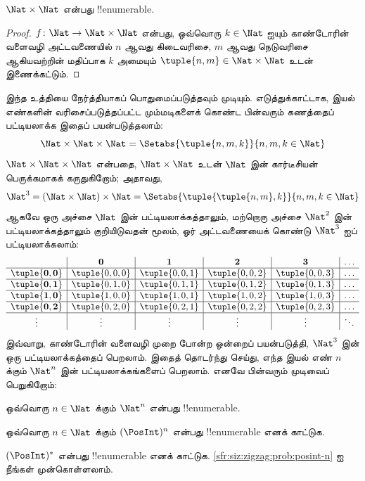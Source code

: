 \documentclass[../../../include/open-logic-section]{subfiles}
\begin{document}
\begin{prop}
$\Nat \times \Nat$ என்பது !!{enumerable}.
\end{prop}

\begin{proof}
$f \colon \Nat \to \Nat\times\Nat$ என்பது,
ஒவ்வொரு $k \in \Nat$ ஐயும் காண்டோரின் வளைவழி அட்டவணையில்
$n$ ஆவது கிடைவரிசை, $m$ ஆவது நெடுவரிசை ஆகியவற்றின் மதிப்பாக
$k$ அமையும் $\tuple{n,m} \in \Nat \times \Nat$ உடன் இணைக்கட்டும்.
\end{proof}

\begin{explain}
இந்த உத்தியை நேர்த்தியாகப் பொதுமைப்படுத்தவும் முடியும்.
எடுத்துக்காட்டாக, இயல் எண்களின் வரிசைப்படுத்தப்பட்ட மும்மடிகளைக்
கொண்ட பின்வரும் கணத்தைப் பட்டியலாக்க இதைப் பயன்படுத்தலாம்:
\[
\Nat \times \Nat \times \Nat = \Setabs{\tuple{n,m,k}}{n,m,k \in \Nat}
\]
$\Nat \times \Nat \times \Nat$ என்பதை,
$\Nat \times \Nat$ உடன் $\Nat$ இன் கார்டீசியன் பெருக்கமாகக்
கருதுகிறோம்; அதாவது,
\[
\Nat^3 = (\Nat \times \Nat) \times \Nat =
\Setabs{\tuple{\tuple{n,m},k}}{n, m, k
  \in \Nat }
\]
ஆகவே ஒரு அச்சை $\Nat$ இன் பட்டியலாக்கத்தாலும்,
மற்றொரு அச்சை $\Nat^2$ இன் பட்டியலாக்கத்தாலும் குறியிடுவதன் மூலம்,
ஓர் அட்டவணையைக் கொண்டு $\Nat^3$ ஐப் பட்டியலாக்கலாம்:
\[
\begin{array}{ c | c | c | c | c | c}
& \mathbf 0 & \mathbf 1 & \mathbf 2 & \mathbf 3 & \dots \\
\hline
\mathbf{\tuple{0,0}} & \tuple{0,0,0} & \tuple{0,0,1} & \tuple{0,0,2} & \tuple{0,0,3} & \dots \\
\hline
\mathbf{\tuple{0,1}} & \tuple{0,1,0} & \tuple{0,1,1} & \tuple{0,1,2} & \tuple{0,1,3} & \dots \\
\hline
\mathbf{\tuple{1,0}} & \tuple{1,0,0} & \tuple{1,0,1} & \tuple{1,0,2} & \tuple{1,0,3} & \dots \\
\hline
\mathbf{\tuple{0,2}} & \tuple{0,2,0} & \tuple{0,2,1} & \tuple{0,2,2} & \tuple{0,2,3} & \dots\\
\hline
\vdots & \vdots & \vdots & \vdots & \vdots & \ddots \\
\end{array}
\]
இவ்வாறு, காண்டோரின் வளைவழி முறை போன்ற ஒன்றைப் பயன்படுத்தி,
$\Nat^3$ இன் ஒரு பட்டியலாக்கத்தைப் பெறலாம்.
இதைத் தொடர்ந்து செய்து, எந்த இயல் எண் $n$ க்கும்
$\Nat^n$ இன் பட்டியலாக்கங்களைப் பெறலாம்.
எனவே பின்வரும் முடிவைப் பெறுகிறோம்:
\end{explain}

\begin{prop}
ஒவ்வொரு $n \in \Nat$ க்கும் $\Nat^n$ என்பது !!{enumerable}.
\end{prop}

\begin{prob}\label{sfr:siz:zigzag:prob:posint-n}
ஒவ்வொரு $n \in \Nat$ க்கும் $(\PosInt)^n$ என்பது
!!{enumerable} எனக் காட்டுக.
\end{prob}

\begin{prob}\label{sfr:siz:zigzag:prob:posint-star}
$(\PosInt)^*$ என்பது !!{enumerable} எனக் காட்டுக.
\cref{sfr:siz:zigzag:prob:posint-n} ஐ நீங்கள் முன்கொள்ளலாம்.
\end{prob}
\end{document}
